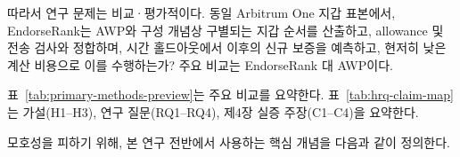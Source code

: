 따라서 연구 문제는 비교·평가적이다. 동일 Arbitrum One 지갑 표본에서, EndorseRank는 AWP와 구성 개념상 구별되는 지갑 순서를 산출하고, allowance 및 전송 검사와 정합하며, 시간 홀드아웃에서 이후의 신규 보증을 예측하고, 현저히 낮은 계산 비용으로 이를 수행하는가? 주요 비교는 EndorseRank 대 AWP이다.

표~\ref{tab:primary-methods-preview}는 주요 비교를 요약한다. 표~\ref{tab:hrq-claim-map}는 가설(H1--H3), 연구 질문(RQ1--RQ4), 제4장 실증 주장(C1--C4)을 요약한다.

\begin{table}[htbp]
\centering
\caption{주요 비교: EndorseRank 대 AWP (매칭 지갑 코호트, $n=5{,}521$).}
\label{tab:primary-methods-preview}
\end{table}

모호성을 피하기 위해, 본 연구 전반에서 사용하는 핵심 개념을 다음과 같이 정의한다.

